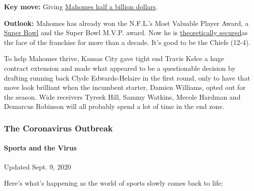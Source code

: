\textbf{Key move:} Giving
\href{https://www.nytimes3xbfgragh.onion/2020/07/06/sports/football/pat-mahomes-contract.html}{Mahomes
half a billion dollars}.

\textbf{Outlook:} Mahomes has already won the N.F.L.'s Most Valuable
Player Award, a
\href{https://www.nytimes3xbfgragh.onion/2020/02/03/sports/football/chiefs-super-bowl.html}{Super
Bowl} and the Super Bowl M.V.P. award. Now he is
\href{https://www.nytimes3xbfgragh.onion/2020/07/08/sports/football/patrick-mahomes-contract-guarantee.html}{theoretically
secured}as the face of the franchise for more than a decade. It's good
to be the Chiefs (12-4).

To help Mahomes thrive, Kansas City gave tight end Travis Kelce a huge
contract extension and made what appeared to be a questionable decision
by drafting running back Clyde Edwards-Helaire in the first round, only
to have that move look brilliant when the incumbent starter, Damien
Williams, opted out for the season. Wide receivers Tyreek Hill, Sammy
Watkins, Mecole Hardman and Demarcus Robinson will all probably spend a
lot of time in the end zone.

\hypertarget{the-coronavirus-outbreak}{%
\subsubsection{The Coronavirus
Outbreak}\label{the-coronavirus-outbreak}}

\hypertarget{sports-and-the-virus}{%
\paragraph{Sports and the Virus}\label{sports-and-the-virus}}

Updated Sept. 9, 2020

Here's what's happening as the world of sports slowly comes back to
life:

